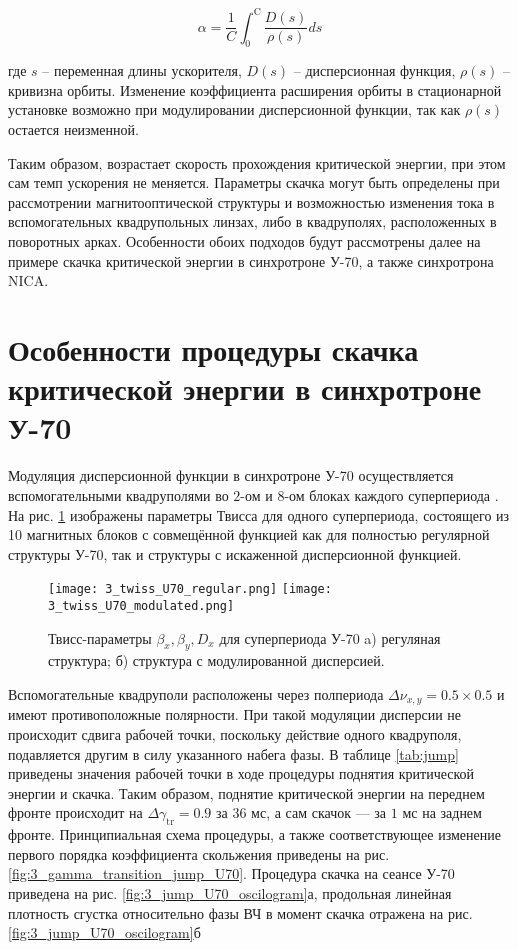 \begin{equation}
\alpha=\frac{1}{C} \int_0^{\mathrm{C}} \frac{D(s)}{\rho(s)} d s
\label{eq:alpha_general}
\end{equation}

\noindent где $s$ -- переменная длины ускорителя, $D\left(s\right)$ -- дисперсионная функция, $\rho\left(s\right)$ -- кривизна орбиты. Изменение коэффициента расширения орбиты в стационарной установке возможно при модулировании дисперсионной функции, так как $\rho\left(s\right)$ остается неизменной. 

\par Таким образом, возрастает скорость прохождения критической энергии, при этом сам темп ускорения не меняется. Параметры скачка могут быть определены при рассмотрении магнитооптической структуры и возможностью изменения тока в вспомогательных квадрупольных линзах, либо в квадруполях, расположенных в поворотных арках. Особенности обоих подходов будут рассмотрены далее на примере скачка критической энергии в синхротроне У-70, а также синхротрона NICA.

\section{Особенности процедуры скачка критической энергии в синхротроне У-70}

\par Модуляция дисперсионной функции в синхротроне У-70 осуществляется вспомогательными квадруполями во $2$-ом и $8$-ом блоках каждого суперпериода \cite{cherniy:ihep}. На рис. \ref{fig:3_twiss_U70} изображены параметры Твисса для одного суперпериода, состоящего из 10 магнитных блоков с совмещённой функцией как для полностью регулярной структуры У-70, так и структуры с искаженной дисперсионной функцией.

\begin{figure} [h!]
   \texttt{[image: 3\_twiss\_U70\_regular.png]}
   \texttt{[image: 3\_twiss\_U70\_modulated.png]}
   \caption{Твисс-параметры $\beta_x,\beta_y, D_x$ для суперпериода У-70 a) регуляная структура; б) структура с модулированной дисперсией.}
   \label{fig:3_twiss_U70}
\end{figure}

\par Вспомогательные квадруполи расположены через полпериода $\Delta\nu_{x,y}=0.5\times0.5$ и имеют противоположные полярности. При такой модуляции дисперсии не происходит сдвига рабочей точки, поскольку действие одного квадруполя, подавляется другим в силу указанного набега фазы. В таблице \ref{tab:jump} приведены значения рабочей точки в ходе процедуры поднятия критической энергии и скачка. Таким образом, поднятие критической энергии на переднем фронте происходит на $\Delta \gamma_{\textrm{tr}}=0.9$ за $36$ мс, а сам скачок — за $1$ мс на заднем фронте. Принципиальная схема процедуры, а также соответствующее изменение первого порядка коэффициента скольжения приведены на рис. \ref{fig:3_gamma_transition_jump_U70}. Процедура скачка на сеансе У-70 приведена на рис. \ref{fig:3_jump_U70_oscilogram}а, продольная линейная плотность сгустка относительно фазы ВЧ в момент скачка отражена на рис. \ref{fig:3_jump_U70_oscilogram}б

